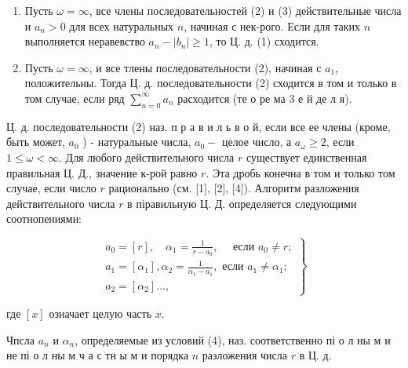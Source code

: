 \documentclass[10pt]{article}
\begin{document}
\begin{enumerate}

  \item Пусть $\omega=\infty$, все члены последовательностей (2) и (3) действительные числа и $a_{n}>0$ для всех натуральных $n$, начиная с нек-рого. Если для таких $n$ выполняется неравевство $a_{n}-\left|b_{n}\right| \geqslant 1$, то Ц. д. (1) сходится.



  \item Пусть $\omega=\infty$, и все тлены последовательности (2), начиная с $a_{1}$, положительны. Тогда Ц. д. последовательности (2) сходится в том и только в том случае, если ряд $\sum_{n=0}^{\infty} a_{n}$ расходится (те о ре ма 3 е й де л я).



\end{enumerate}



Ц. д. последовательности (2) наз. п р а в и л ь в о й, если все ее члены (кроме, быть может, $a_{0}$ ) - натуральные числа, $a_{0}-$ целое число, а $a_{\omega} \geqslant 2$, если $1 \leqslant \omega<\infty$. Для любого действительного числа $r$ существует единственная правильная Ц. Д., значение к-рой равно $r$. Эта дробь конечна в том и только том случае, если число $r$ рационально (см. [1], [2], [4]). Алгоритм разложения действительного числа $r$ в піравильную Ц. Д. определяется следующими соотнопениями:



\[

\left.\begin{array}{l}

a_{0}=[r], \quad \alpha_{1}=\frac{1}{r-a_{0}}, \quad \text { если } a_{0} \neq r ; \\

a_{1}=\left[\alpha_{1}\right], \alpha_{2}=\frac{1}{\alpha_{1}-a_{1}}, \text { если } a_{1} \neq \alpha_{1} ; \\

a_{2}=\left[\alpha_{2}\right] \ldots,

\end{array}\right\}

\]



где $[x]$ означает целую часть $x$.



Чпсла $a_{n}$ и $\alpha_{n}$, определяемые из условий (4), наз. соответственно пі о л ны м и не пі о л ны м ч а с тн ы м и порядка $n$ разложения числа $r$ в Ц. д.
\end{document}
